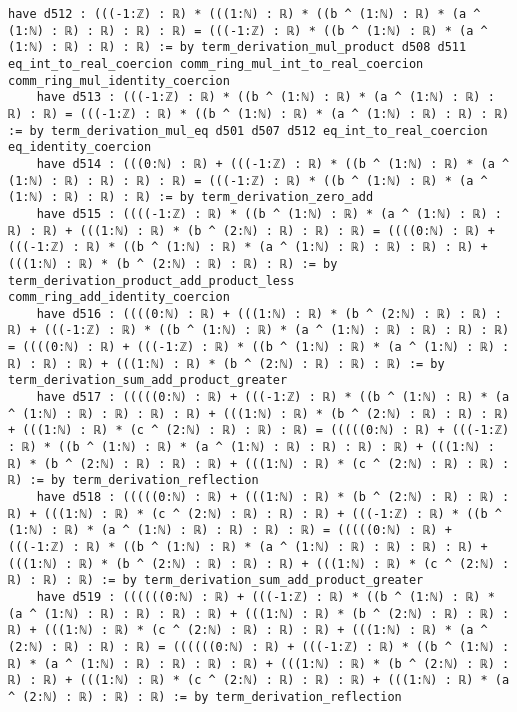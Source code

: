 \documentclass{article}
\begin{document}
\begin{tcolorbox}[colback=white!10, width=\linewidth]
\begin{lstlisting}[language=Lean4]
    have d512 : (((-1:ℤ) : ℝ) * (((1:ℕ) : ℝ) * ((b ^ (1:ℕ) : ℝ) * (a ^ (1:ℕ) : ℝ) : ℝ) : ℝ) : ℝ) = (((-1:ℤ) : ℝ) * ((b ^ (1:ℕ) : ℝ) * (a ^ (1:ℕ) : ℝ) : ℝ) : ℝ) := by term_derivation_mul_product d508 d511 eq_int_to_real_coercion comm_ring_mul_int_to_real_coercion comm_ring_mul_identity_coercion
    have d513 : (((-1:ℤ) : ℝ) * ((b ^ (1:ℕ) : ℝ) * (a ^ (1:ℕ) : ℝ) : ℝ) : ℝ) = (((-1:ℤ) : ℝ) * ((b ^ (1:ℕ) : ℝ) * (a ^ (1:ℕ) : ℝ) : ℝ) : ℝ) := by term_derivation_mul_eq d501 d507 d512 eq_int_to_real_coercion eq_identity_coercion
    have d514 : (((0:ℕ) : ℝ) + (((-1:ℤ) : ℝ) * ((b ^ (1:ℕ) : ℝ) * (a ^ (1:ℕ) : ℝ) : ℝ) : ℝ) : ℝ) = (((-1:ℤ) : ℝ) * ((b ^ (1:ℕ) : ℝ) * (a ^ (1:ℕ) : ℝ) : ℝ) : ℝ) := by term_derivation_zero_add
    have d515 : ((((-1:ℤ) : ℝ) * ((b ^ (1:ℕ) : ℝ) * (a ^ (1:ℕ) : ℝ) : ℝ) : ℝ) + (((1:ℕ) : ℝ) * (b ^ (2:ℕ) : ℝ) : ℝ) : ℝ) = ((((0:ℕ) : ℝ) + (((-1:ℤ) : ℝ) * ((b ^ (1:ℕ) : ℝ) * (a ^ (1:ℕ) : ℝ) : ℝ) : ℝ) : ℝ) + (((1:ℕ) : ℝ) * (b ^ (2:ℕ) : ℝ) : ℝ) : ℝ) := by term_derivation_product_add_product_less comm_ring_add_identity_coercion
    have d516 : ((((0:ℕ) : ℝ) + (((1:ℕ) : ℝ) * (b ^ (2:ℕ) : ℝ) : ℝ) : ℝ) + (((-1:ℤ) : ℝ) * ((b ^ (1:ℕ) : ℝ) * (a ^ (1:ℕ) : ℝ) : ℝ) : ℝ) : ℝ) = ((((0:ℕ) : ℝ) + (((-1:ℤ) : ℝ) * ((b ^ (1:ℕ) : ℝ) * (a ^ (1:ℕ) : ℝ) : ℝ) : ℝ) : ℝ) + (((1:ℕ) : ℝ) * (b ^ (2:ℕ) : ℝ) : ℝ) : ℝ) := by term_derivation_sum_add_product_greater
    have d517 : (((((0:ℕ) : ℝ) + (((-1:ℤ) : ℝ) * ((b ^ (1:ℕ) : ℝ) * (a ^ (1:ℕ) : ℝ) : ℝ) : ℝ) : ℝ) + (((1:ℕ) : ℝ) * (b ^ (2:ℕ) : ℝ) : ℝ) : ℝ) + (((1:ℕ) : ℝ) * (c ^ (2:ℕ) : ℝ) : ℝ) : ℝ) = (((((0:ℕ) : ℝ) + (((-1:ℤ) : ℝ) * ((b ^ (1:ℕ) : ℝ) * (a ^ (1:ℕ) : ℝ) : ℝ) : ℝ) : ℝ) + (((1:ℕ) : ℝ) * (b ^ (2:ℕ) : ℝ) : ℝ) : ℝ) + (((1:ℕ) : ℝ) * (c ^ (2:ℕ) : ℝ) : ℝ) : ℝ) := by term_derivation_reflection
    have d518 : (((((0:ℕ) : ℝ) + (((1:ℕ) : ℝ) * (b ^ (2:ℕ) : ℝ) : ℝ) : ℝ) + (((1:ℕ) : ℝ) * (c ^ (2:ℕ) : ℝ) : ℝ) : ℝ) + (((-1:ℤ) : ℝ) * ((b ^ (1:ℕ) : ℝ) * (a ^ (1:ℕ) : ℝ) : ℝ) : ℝ) : ℝ) = (((((0:ℕ) : ℝ) + (((-1:ℤ) : ℝ) * ((b ^ (1:ℕ) : ℝ) * (a ^ (1:ℕ) : ℝ) : ℝ) : ℝ) : ℝ) + (((1:ℕ) : ℝ) * (b ^ (2:ℕ) : ℝ) : ℝ) : ℝ) + (((1:ℕ) : ℝ) * (c ^ (2:ℕ) : ℝ) : ℝ) : ℝ) := by term_derivation_sum_add_product_greater
    have d519 : ((((((0:ℕ) : ℝ) + (((-1:ℤ) : ℝ) * ((b ^ (1:ℕ) : ℝ) * (a ^ (1:ℕ) : ℝ) : ℝ) : ℝ) : ℝ) + (((1:ℕ) : ℝ) * (b ^ (2:ℕ) : ℝ) : ℝ) : ℝ) + (((1:ℕ) : ℝ) * (c ^ (2:ℕ) : ℝ) : ℝ) : ℝ) + (((1:ℕ) : ℝ) * (a ^ (2:ℕ) : ℝ) : ℝ) : ℝ) = ((((((0:ℕ) : ℝ) + (((-1:ℤ) : ℝ) * ((b ^ (1:ℕ) : ℝ) * (a ^ (1:ℕ) : ℝ) : ℝ) : ℝ) : ℝ) + (((1:ℕ) : ℝ) * (b ^ (2:ℕ) : ℝ) : ℝ) : ℝ) + (((1:ℕ) : ℝ) * (c ^ (2:ℕ) : ℝ) : ℝ) : ℝ) + (((1:ℕ) : ℝ) * (a ^ (2:ℕ) : ℝ) : ℝ) : ℝ) := by term_derivation_reflection

\end{lstlisting}
\end{tcolorbox}
\end{document}
